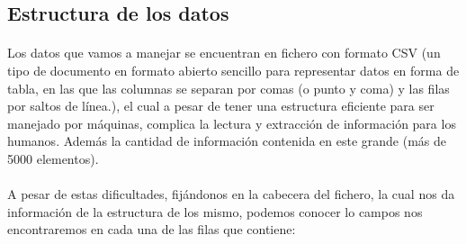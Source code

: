 \documentclass{article}
\begin{document}
		\subsection{Estructura de los datos}

			\paragraph{}
			Los datos que vamos a manejar se encuentran en fichero con formato CSV (un tipo de documento en formato abierto sencillo para representar datos en forma de tabla, en las que las columnas se separan por comas (o punto y coma) y las filas por saltos de línea.), el cual a pesar de tener una estructura eficiente para ser manejado por máquinas, complica la lectura y extracción de información para los humanos. Además la cantidad de información contenida en este grande (más de 5000 elementos).

			\paragraph{}
			A pesar de estas dificultades, fijándonos en la cabecera del fichero, la cual nos da información de la estructura de los mismo, podemos conocer lo campos nos encontraremos en cada una de las filas que contiene:
\end{document}
